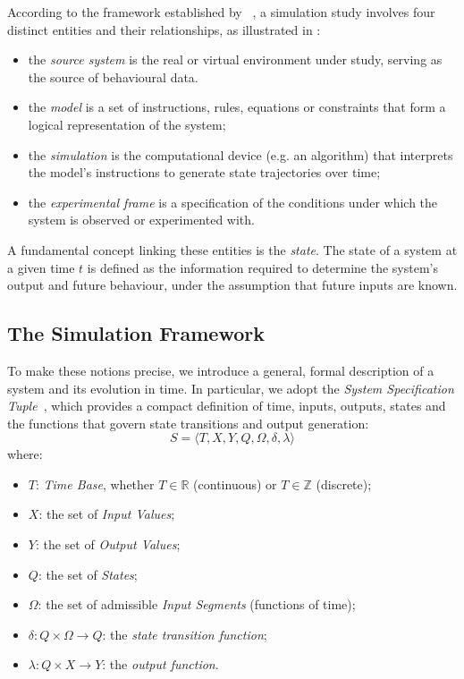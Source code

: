 According to the framework established by ~\cite{Zeigler:2000}, a simulation
study involves four distinct entities and their relationships, as illustrated
in :
%
%
\begin{itemize}
	\item the \emph{source system} is the real or virtual environment under
	      study, serving as the source of behavioural data.
	\item the \emph{model} is a set of instructions, rules, equations or
	      constraints that form a logical representation of the system;
	\item the \emph{simulation} is the computational device (e.g. an
	      algorithm) that interprets the model's instructions to generate
	      state trajectories over time;
	\item the \emph{experimental frame} is a specification of the
	      conditions under which the system is observed or experimented
	      with.
\end{itemize}
A fundamental concept linking these entities is the \emph{state}. The state of a
system at a given time $t$ is defined as the information required to determine
the system's output and future behaviour, under the assumption that future
inputs are known.

\subsection{The Simulation Framework}
To make these notions precise, we introduce a general, formal description of a
system and its evolution in time. In particular, we adopt the \emph{System
	Specification Tuple}~\cite{Zeigler:2000}, which provides a compact definition
of time, inputs, outputs, states and the functions that govern state
transitions and output generation:
\begin{equation}\label{eq:sys_spec_tup}
	S = \langle T, X, Y, Q, \Omega, \delta, \lambda \rangle
\end{equation}
where:

\begin{itemize}
	\item $T$: \emph{Time Base}, whether $T \in \mathbb{R}$ (continuous) or $T
		      \in \mathbb{Z}$ (discrete);
	\item $X$: the set of \emph{Input Values};
	\item $Y$: the set of \emph{Output Values};
	\item $Q$: the set of \emph{States};
	\item $\Omega$: the set of admissible \emph{Input Segments} (functions of time);
	\item $\delta : Q \times \Omega \rightarrow Q $: the \emph{state transition function};
	\item $\lambda : Q \times X \rightarrow Y$: the \emph{output function}.
\end{itemize}

